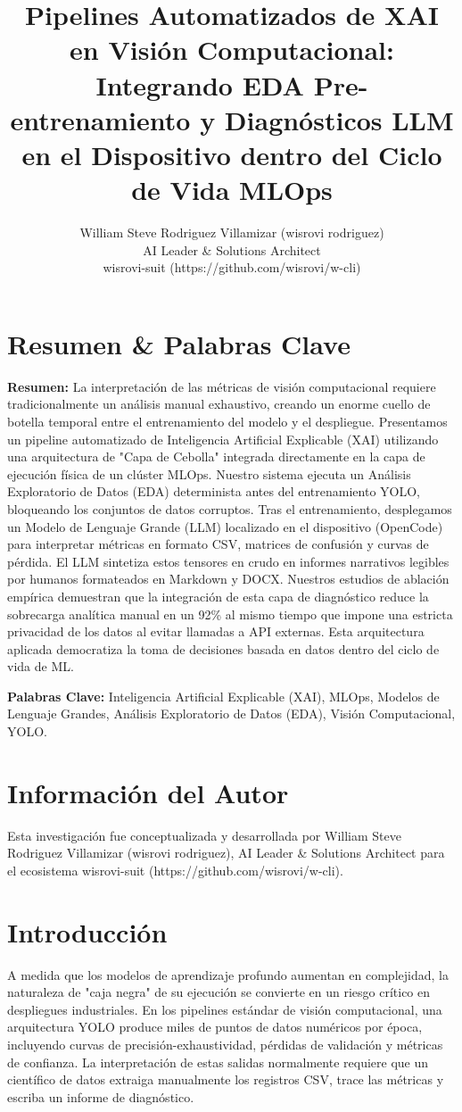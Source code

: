 \documentclass[10pt,twocolumn,letterpaper]{article}
\title{Pipelines Automatizados de XAI en Visión Computacional: Integrando EDA Pre-entrenamiento y Diagnósticos LLM en el Dispositivo dentro del Ciclo de Vida MLOps}
\author{William Steve Rodriguez Villamizar (wisrovi rodriguez)\\AI Leader \& Solutions Architect\\wisrovi-suit (https://github.com/wisrovi/w-cli)}
\date{}
\begin{document}
\maketitle

\section{Resumen \& Palabras Clave}
\textbf{Resumen:} La interpretación de las métricas de visión computacional requiere tradicionalmente un análisis manual exhaustivo, creando un enorme cuello de botella temporal entre el entrenamiento del modelo y el despliegue. Presentamos un pipeline automatizado de Inteligencia Artificial Explicable (XAI) utilizando una arquitectura de "Capa de Cebolla" integrada directamente en la capa de ejecución física de un clúster MLOps. Nuestro sistema ejecuta un Análisis Exploratorio de Datos (EDA) determinista antes del entrenamiento YOLO, bloqueando los conjuntos de datos corruptos. Tras el entrenamiento, desplegamos un Modelo de Lenguaje Grande (LLM) localizado en el dispositivo (OpenCode) para interpretar métricas en formato CSV, matrices de confusión y curvas de pérdida. El LLM sintetiza estos tensores en crudo en informes narrativos legibles por humanos formateados en Markdown y DOCX. Nuestros estudios de ablación empírica demuestran que la integración de esta capa de diagnóstico reduce la sobrecarga analítica manual en un 92\% al mismo tiempo que impone una estricta privacidad de los datos al evitar llamadas a API externas. Esta arquitectura aplicada democratiza la toma de decisiones basada en datos dentro del ciclo de vida de ML.

\textbf{Palabras Clave:} Inteligencia Artificial Explicable (XAI), MLOps, Modelos de Lenguaje Grandes, Análisis Exploratorio de Datos (EDA), Visión Computacional, YOLO.

\section{Información del Autor}
Esta investigación fue conceptualizada y desarrollada por William Steve Rodriguez Villamizar (wisrovi rodriguez), AI Leader \& Solutions Architect para el ecosistema wisrovi-suit (https://github.com/wisrovi/w-cli).

\section{Introducción}
A medida que los modelos de aprendizaje profundo aumentan en complejidad, la naturaleza de "caja negra" de su ejecución se convierte en un riesgo crítico en despliegues industriales. En los pipelines estándar de visión computacional, una arquitectura YOLO produce miles de puntos de datos numéricos por época, incluyendo curvas de precisión-exhaustividad, pérdidas de validación y métricas de confianza. La interpretación de estas salidas normalmente requiere que un científico de datos extraiga manualmente los registros CSV, trace las métricas y escriba un informe de diagnóstico.
\end{document}

